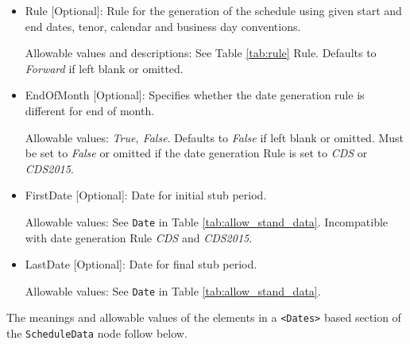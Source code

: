 \begin{itemize}
\item Rule [Optional]: Rule for the generation of the schedule using given
  start and end dates, tenor, calendar and business day conventions. 

Allowable values and descriptions: See Table \ref{tab:rule} Rule. Defaults to \emph{Forward} if left blank or omitted.

\item EndOfMonth [Optional]: Specifies whether the date generation rule is different for end of month. 

Allowable values: \emph{True, False}. Defaults to \emph{False} if left blank or omitted. Must be set to \emph{False} or omitted if the date generation Rule is set to \emph{CDS} or \emph{CDS2015}.

\item FirstDate [Optional]: Date for initial stub period.

Allowable values: See \lstinline!Date! in Table \ref{tab:allow_stand_data}. Incompatible with date generation Rule  \emph{CDS} and \emph{CDS2015}.

\item LastDate [Optional]: Date for final stub period.

Allowable values: See \lstinline!Date! in Table \ref{tab:allow_stand_data}.
\end{itemize}

\medskip
The meanings and allowable values of the elements in a {\tt <Dates>} based section of the  \lstinline!ScheduleData! node follow below.

